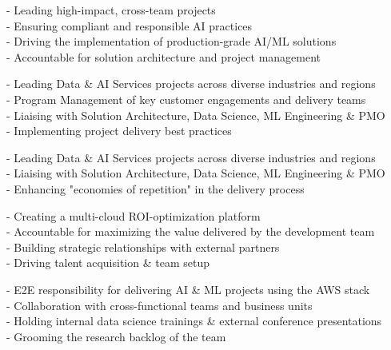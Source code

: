 \documentclass[a4paper]{twentysecondcv} %
\begin{document}
\begin{twenty} %

{\small - Leading high-impact, cross-team projects \\
		- Ensuring compliant and responsible AI practices \\
		- Driving the implementation of production-grade AI/ML solutions\\
        - Accountable for solution architecture and project management 
}	

{\small - Leading Data \& AI Services projects across diverse industries and regions\\
        - Program Management of key customer engagements and delivery teams\\
        - Liaising with Solution Architecture, Data Science, ML Engineering \& PMO\\
        - Implementing project delivery best practices
}	

{\small - Leading Data \& AI Services projects across diverse industries and regions\\
- Liaising with Solution Architecture, Data Science, ML Engineering \& PMO\\
- Enhancing "economies of repetition" in the delivery process
}

{\small - Creating a multi-cloud ROI-optimization platform\\
        - Accountable for maximizing the value delivered by the development team\\
        - Building strategic relationships with external partners\\
        - Driving talent acquisition \& team setup
}

{\small - E2E responsibility for delivering AI \& ML projects using the AWS stack\\
		- Collaboration with cross-functional teams and business units\\  
        - Holding internal data science trainings \& external conference presentations\\
        - Grooming the research backlog of the team
}


\end{twenty}
\end{document}

